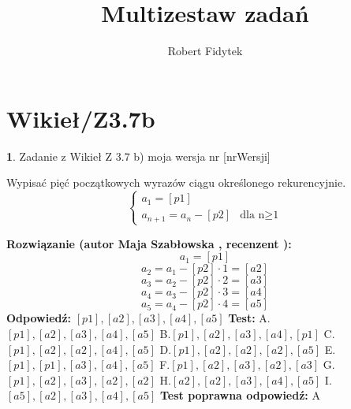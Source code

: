 \documentclass[12pt, a4paper]{article}
\title{Multizestaw zadań}
\author{Robert Fidytek}
\date{}
\theoremstyle{definition} %
\newtheorem{zad}{}
\newcommand{\kategoria}[1]{\section{#1}} %
\newcommand{\zadStart}[1]{\begin{zad}#1\newline} %
\newcommand{\zadStop}{\end{zad}}   %
\newcommand{\rozwStart}[2]{\noindent \textbf{Rozwiązanie (autor #1 , recenzent #2): }\newline} %
\newcommand{\rozwStop}{\newline}                                            %
\newcommand{\odpStart}{\noindent \textbf{Odpowiedź:}\newline}    %
\newcommand{\odpStop}{\newline}                                             %
\newcommand{\testStart}{\noindent \textbf{Test:}\newline} %
\newcommand{\testStop}{\newline} %
\newcommand{\kluczStart}{\noindent \textbf{Test poprawna odpowiedź:}\newline} %
\newcommand{\kluczStop}{\newline} %
\begin{document}
\maketitle


\kategoria{Wikieł/Z3.7b}
\zadStart{Zadanie z Wikieł Z 3.7 b)  moja wersja nr [nrWersji]}

Wypisać pięć początkowych wyrazów ciągu określonego rekurencyjnie.
$$\left\{ \begin{array}{ll}
a_{1}=[p1]\\
a_{n+1}=a_{n}-[p2]& \textrm{dla n$\geq$1} 
\end{array} \right.
$$
\zadStop
\rozwStart{Maja Szabłowska}{}
$$a_{1}=[p1]$$
$$a_{2}=a_{1}-[p2]\cdot1=[a2]$$
$$a_{3}=a_{2}-[p2]\cdot2=[a3]$$
$$a_{4}=a_{3}-[p2]\cdot3=[a4]$$
$$a_{5}=a_{4}-[p2]\cdot4=[a5]$$
\rozwStop
\odpStart
$[p1],[a2],[a3],[a4],[a5]$
\odpStop
\testStart
A.$[p1],[a2],[a3],[a4],[a5]$
B.$[p1],[a2],[a3],[a4],[p1]$
C.$[p1],[a2],[a2],[a4],[a5]$
D.$[p1],[a2],[a2],[a2],[a5]$
E.$[p1],[p1],[a3],[a4],[a5]$
F.$[p1],[a2],[a3],[a2],[a3]$
G.$[p1],[a2],[a3],[a2],[a2]$
H.$[a2],[a2],[a3],[a4],[a5]$
I.$[a5],[a2],[a3],[a4],[a5]$
\testStop
\kluczStart
A
\kluczStop
\end{document}

